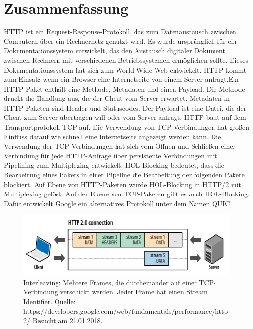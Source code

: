 \documentclass{llncs}
\begin{document}
\section{Zusammenfassung}
HTTP ist ein Request-Response-Protokoll, das zum Datenaustausch zwischen Computern über ein Rechnernetz genutzt wird. Es wurde ursprünglich für ein Dokumentationssystem entwickelt, das den Austausch digitaler Dokument zwischen Rechnern mit verschiedenen Betriebssystemen ermöglichen sollte. Dieses Dokumentationssystem hat sich zum World Wide Web entwickelt. 
HTTP kommt zum Einsatz wenn ein Browser eine Internetseite von einem Server anfragt.\newline Ein HTTP-Paket enthält eine Methode, Metadaten und einen Payload. Die Methode drückt die Handlung aus, die der Client vom Server erwartet. Metadaten in HTTP-Paketen sind Header und Statuscodes. Der Payload ist eine Datei, die der Client zum Server übertragen will oder vom Server anfragt. \newline
HTTP baut auf dem Transportprotokoll TCP auf.
Die Verwendung von TCP-Verbindungen hat großen Einfluss darauf wie schnell eine Internetseite angezeigt werden kann. Die Verwendung der TCP-Verbindungen hat sich vom Öffnen und Schließen einer Verbindung für jede HTTP-Anfrage über persistente Verbindungen mit Pipelining zum Multiplexing entwickelt. \newline
HOL-Blocking bedeutet, dass die Bearbeitung eines Pakets in einer Pipeline die Bearbeitung der folgenden Pakete blockiert. Auf Ebene von HTTP-Paketen wurde HOL-Blocking in HTTP/2 mit Multiplexing gelöst.
 Auf der Ebene von TCP-Paketen gibt es auch HOL-Blocking. Dafür entwickelt Google ein alternatives Protokoll unter dem Namen QUIC.
 \begin{figure}[!ht]
\includegraphics[width=\columnwidth]{Multiplexing.png}
\caption{Interleaving: Mehrere Frames, die durcheinander auf einer TCP-Verbindung verschickt werden. Jeder Frame hat einen Stream Identifier. \newline
Quelle: https://developers.google.com/web/fundamentals/performance/http2/ \newline
Besucht am 21.01.2018.}
\end{figure}





\end{document}
